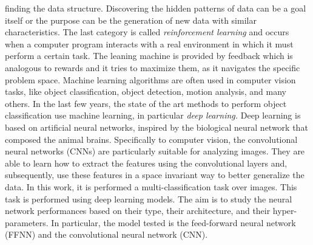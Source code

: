finding the data structure. Discovering the hidden patterns of data can
be a goal itself or the purpose can be the generation of new data with
similar characteristics. The last category is called \emph{reinforcement
learning} and occurs when a computer program interacts with a real
environment in which it must perform a certain task. The leaning machine
is provided by feedback which is analogous to rewards and it tries to
maximize them, as it navigates the specific problem space. Machine
learning algorithms are often used in computer vision tasks, like object
classification, object detection, motion analysis, and many others. In
the last few years, the state of the art methods to perform object
classification use machine learning, in particular \emph{deep learning.}
Deep learning is based on artificial neural networks, inspired by the
biological neural network that composed the animal brains. Specifically
to computer vision, the convolutional neural networks (CNNs) are
particularly suitable for analyzing images. They are able to learn how
to extract the features using the convolutional layers and,
subsequently, use these features in a space invariant way to better
generalize the data. In this work, it is performed a
multi-classification task over images. This task is performed using deep
learning models. The aim is to study the neural network performances
based on their type, their architecture, and their hyper-parameters. In
particular, the model tested is the feed-forward neural network (FFNN)
and the convolutional neural network (CNN).